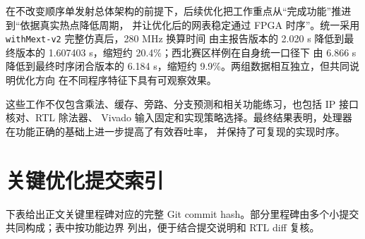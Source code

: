 \documentclass[UTF8,a4paper,12pt]{ctexart}
\newcommand{\code}[1]{\texttt{#1}}
\begin{document}
在不改变顺序单发射总体架构的前提下，后续优化把工作重点从“完成功能”推进到“依据真实热点降低周期，
并让优化后的网表稳定通过 FPGA 时序”。统一采用 \code{withMext-v2} 完整仿真后，280 MHz 换算时间
由主报告版本的 2.020 s 降低到最终版本的 1.607403 s，缩短约 20.4\%；西北赛区样例在自身统一口径下
由 6.866 s 降低到最终时序闭合版本的 6.184 s，缩短约 9.9\%。两组数据相互独立，但共同说明优化方向
在不同程序特征下具有可观察效果。

这些工作不仅包含乘法、缓存、旁路、分支预测和相关功能练习，也包括 IP 接口核对、RTL 除法器、
Vivado 输入固定和实现策略选择。最终结果表明，处理器在功能正确的基础上进一步提高了有效吞吐率，
并保持了可复现的实现时序。

\appendix
\section{关键优化提交索引}

下表给出正文关键里程碑对应的完整 Git commit hash。部分里程碑由多个小提交共同构成；表中按功能边界
列出，便于结合提交说明和 RTL diff 复核。
\end{document}
